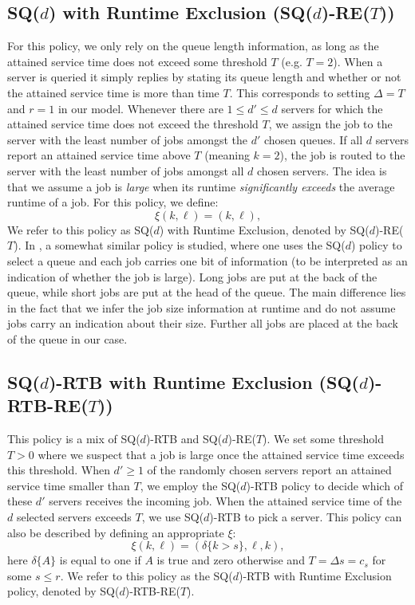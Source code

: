 \documentclass[12pt]{report}
\begin{document}
\subsection{SQ($d$) with Runtime Exclusion (SQ($d$)-RE($T$))}\label{sec:RE}
For this policy, we only rely on the queue length information, as long as the attained service
time does not exceed some threshold $T$ (e.g. $T = 2$). When a server is queried it simply replies by stating its queue length and whether or not the attained service time
is more than time $T$. This corresponds to setting $\Delta = T$ and $r=1$ in our model.
Whenever there are $1\leq d' \leq d$ servers for which the attained service time does not exceed the threshold $T$, we assign the job to the server with the least number of jobs amongst the $d'$ chosen queues. If all $d$ servers report an attained service time above $T$ (meaning $k = 2$), the job is routed to the server with the least number of jobs amongst all $d$ chosen servers. The idea is that we assume a job is \textit{large} when its runtime \textit{significantly exceeds} the average runtime of a job. For this policy, we define:
\begin{equation}\label{eq:xi_SQ_RE}
\xi(k,\ell)=(k, \ell),
\end{equation}
We refer to this policy as  SQ($d$) with Runtime Exclusion, denoted by SQ($d$)-RE($T$).
  In \cite{mitzenmacher2020queues}, a somewhat similar policy is studied, where one uses the SQ($d$) policy to select a queue and each job carries one bit of information (to be interpreted as an indication of whether the job is large). Long jobs are put at the back of the queue, while short jobs are put at the head of the queue. The main difference lies in the fact that we infer the job size information at runtime and do not assume jobs carry an indication about their size.
Further all jobs are placed at the back of the queue in our case. 

\subsection{SQ($d$)-RTB with Runtime Exclusion (SQ($d$)-RTB-RE($T$))}
This policy is a mix of SQ($d$)-RTB and SQ($d$)-RE($T$). We set some threshold $T > 0$ where we suspect that a job is large once the attained service time exceeds this threshold. When $d' \geq 1$ of the randomly chosen servers report an attained service time smaller than $T$, we employ the SQ($d$)-RTB policy to decide which of these $d'$ servers receives the incoming job. When the attained service time of the $d$ selected servers exceeds $T$, we use SQ($d$)-RTB to pick a server. This policy can also be described by defining an appropriate $\xi$:
\begin{equation}\label{eq:xi_SQd_RTB_RE}
\xi(k, \ell)
=
(\delta\{k > s\}, \ell, k),
\end{equation}
here $\delta\{A\}$ is equal to one if $A$ is true and zero otherwise and $T = \Delta s = c_s$ for some $s \leq r$.
We refer to this policy as the SQ($d$)-RTB with Runtime Exclusion policy, denoted by SQ($d$)-RTB-RE($T$). 
\end{document}
